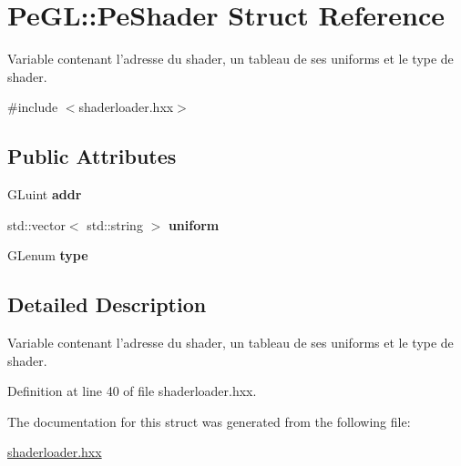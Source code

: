 \hypertarget{structPeGL_1_1PeShader}{\section{Pe\-G\-L\-:\-:Pe\-Shader Struct Reference}
\label{structPeGL_1_1PeShader}
}


Variable contenant l'adresse du shader, un tableau de ses uniforms et le type de shader.  




{\ttfamily \#include $<$shaderloader.\-hxx$>$}

\subsection*{Public Attributes}
\begin{DoxyCompactItemize}
\item 
\hypertarget{structPeGL_1_1PeShader_acd79f631a095b8b094b1b31f02b1b0f6}{G\-Luint {\bfseries addr}}\label{structPeGL_1_1PeShader_acd79f631a095b8b094b1b31f02b1b0f6}

\item 
\hypertarget{structPeGL_1_1PeShader_acc8d150f3c8ad5589c81cef5ace3b189}{std\-::vector$<$ std\-::string $>$ {\bfseries uniform}}\label{structPeGL_1_1PeShader_acc8d150f3c8ad5589c81cef5ace3b189}

\item 
\hypertarget{structPeGL_1_1PeShader_a72a5538c6f7a96e5b9f5598827b2a3ad}{G\-Lenum {\bfseries type}}\label{structPeGL_1_1PeShader_a72a5538c6f7a96e5b9f5598827b2a3ad}

\end{DoxyCompactItemize}


\subsection{Detailed Description}
Variable contenant l'adresse du shader, un tableau de ses uniforms et le type de shader. 

Definition at line 40 of file shaderloader.\-hxx.



The documentation for this struct was generated from the following file\-:\begin{DoxyCompactItemize}
\item 
\hyperlink{shaderloader_8hxx}{shaderloader.\-hxx}\end{DoxyCompactItemize}
